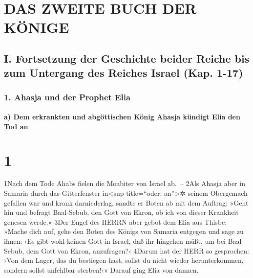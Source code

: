 \hypertarget{das-zweite-buch-der-kuxf6nige}{%
\section{DAS ZWEITE BUCH DER
KÖNIGE}\label{das-zweite-buch-der-kuxf6nige}}

\hypertarget{i.-fortsetzung-der-geschichte-beider-reiche-bis-zum-untergang-des-reiches-israel-kap.-1-17}{%
\subsection{I. Fortsetzung der Geschichte beider Reiche bis zum
Untergang des Reiches Israel (Kap.
1-17)}\label{i.-fortsetzung-der-geschichte-beider-reiche-bis-zum-untergang-des-reiches-israel-kap.-1-17}}

\hypertarget{ahasja-und-der-prophet-elia}{%
\subsubsection{1. Ahasja und der Prophet
Elia}\label{ahasja-und-der-prophet-elia}}

\hypertarget{a-dem-erkrankten-und-abguxf6ttischen-kuxf6nig-ahasja-kuxfcndigt-elia-den-tod-an}{%
\paragraph{a) Dem erkrankten und abgöttischen König Ahasja kündigt Elia
den Tod
an}\label{a-dem-erkrankten-und-abguxf6ttischen-kuxf6nig-ahasja-kuxfcndigt-elia-den-tod-an}}

\hypertarget{section}{%
\section{1}\label{section}}

1Nach dem Tode Ahabs fielen die Moabiter von Israel ab.~-- 2Als Ahasja
aber in Samaria durch das Gitterfenster in\textless sup title=``oder:
an''\textgreater✲ seinem Obergemach gefallen war und krank darniederlag,
sandte er Boten ab mit dem Auftrag: »Geht hin und befragt Baal-Sebub,
den Gott von Ekron, ob ich von dieser Krankheit genesen werde.« 3Der
Engel des HERRN aber gebot dem Elia aus Thisbe: »Mache dich auf, gehe
den Boten des Königs von Samaria entgegen und sage zu ihnen: ›Es gibt
wohl keinen Gott in Israel, daß ihr hingehen müßt, um bei Baal-Sebub,
dem Gott von Ekron, anzufragen?‹ 4Darum hat der HERR so gesprochen: ›Von
dem Lager, das du bestiegen hast, sollst du nicht wieder herunterkommen,
sondern sollst unfehlbar sterben!‹« Darauf ging Elia von dannen.

